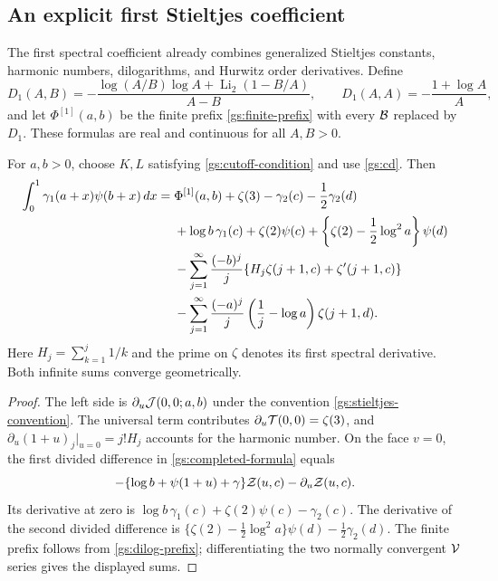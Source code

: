 \subsection{An explicit first Stieltjes coefficient}

The first spectral coefficient already combines generalized Stieltjes
constants, harmonic numbers, dilogarithms, and Hurwitz order
derivatives.  Define
\[
 D_1(A,B)=-\frac{\log(A/B)\log A+
                   \operatorname{Li}_2(1-B/A)}{A-B},
 \qquad D_1(A,A)=-\frac{1+\log A}{A},
\]
and let $\Phi^{[1]}(a,b)$ be the finite prefix
\eqref{gs:finite-prefix} with every $\mathcal B$ replaced by $D_1$.
These formulas are real and continuous for all $A,B>0$.

\begin{corollary}
\label{gs:gamma1-digamma}
For $a,b>0$, choose $K,L$ satisfying
\eqref{gs:cutoff-condition} and use \eqref{gs:cd}.  Then
\begin{align}
 \int_0^1\gamma_1(a+x)\psi(b+x)\,dx
 ={}&\Phi^{[1]}(a,b)+\zeta(3)-\gamma_2(c)-\frac12\gamma_2(d)
       \notag\\
 &+\log b\,\gamma_1(c)+\zeta(2)\psi(c)
   +\left\{\zeta(2)-\frac12\log^2a\right\}\psi(d)\notag\\
 &-\sum_{j=1}^\infty\frac{(-b)^j}{j}
       \{H_j\zeta(j+1,c)+\zeta'(j+1,c)\}\notag\\
 &-\sum_{j=1}^\infty\frac{(-a)^j}{j}
          \left(\frac1j-\log a\right)\zeta(j+1,d).
 \label{gs:gamma1-digamma-formula}
\end{align}
Here $H_j=\sum_{k=1}^j1/k$ and the prime on $\zeta$ denotes its
first spectral derivative.  Both infinite sums converge geometrically.
\end{corollary}

\begin{proof}
The left side is $\partial_u\mathcal J(0,0;a,b)$ under the convention
\eqref{gs:stieltjes-convention}.  The universal term contributes
$\partial_u\mathcal T(0,0)=\zeta(3)$, and
$\partial_u(1+u)_j|_{u=0}=j!H_j$ accounts for the harmonic number.
On the face $v=0$, the first divided difference in
\eqref{gs:completed-formula} equals
\[
 -\{\log b+\psi(1+u)+\gamma\}\mathcal Z(u,c)
 -\partial_u\mathcal Z(u,c).
\]
Its derivative at zero is
$\log b\,\gamma_1(c)+\zeta(2)\psi(c)-\gamma_2(c)$.
The derivative of the second divided difference is
$\{\zeta(2)-\tfrac12\log^2a\}\psi(d)-\tfrac12\gamma_2(d)$.
The finite prefix follows from \eqref{gs:dilog-prefix}; differentiating
the two normally convergent $\mathcal V$ series gives the displayed sums.
\end{proof}

